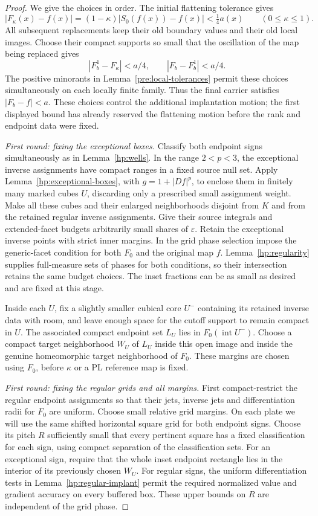 \documentclass[11pt]{article}
\numberwithin{equation}{section}
\theoremstyle{definition}
\theoremstyle{remark}
\begin{document}
\begin{proof}
We give the choices in order.  The initial flattening tolerance gives
\[
 |F_\kappa(x)-f(x)|
   =(1-\kappa)|S_0(f(x))-f(x)|<\tfrac14a(x)
       \qquad(0\leq\kappa\leq1).
\]
All subsequent replacements keep their old boundary values and their
old local images.  Choose their compact supports so small that the
oscillation of the map being replaced gives
\[
 |F_b^1-F_\kappa|<a/4,
 \qquad |F_b-F_b^1|<a/4.
\]
The positive minorants in Lemma~\ref{pre:local-tolerances} permit these
choices simultaneously on each locally finite family.  Thus the final
carrier satisfies $|F_b-f|<a$.  These choices control the additional
implantation motion; the first displayed bound has already reserved
the flattening motion before the rank and endpoint data were fixed.

\emph{First round: fixing the exceptional boxes.}
Classify both endpoint signs simultaneously as in
Lemma~\ref{hp:wells}.  In the range $2<p<3$, the exceptional inverse
assignments have compact ranges in a fixed source null set.  Apply
Lemma~\ref{hp:exceptional-boxes}, with $g=1+|Df|^p$, to enclose them
in finitely many marked cubes $U$, discarding only a prescribed
small assignment weight.  Make all these cubes and their enlarged
neighborhoods disjoint from $K$ and from the retained regular inverse
assignments.  Give their source integrals and extended-facet budgets
arbitrarily small shares of $\varepsilon$.  Retain the exceptional inverse
points with strict inner margins.  In the grid phase selection impose
the generic-facet condition for both $F_0$ and the original map $f$.
Lemma~\ref{hp:regularity} supplies full-measure sets of phases for
both conditions, so their intersection retains the same budget choices.
The inset fractions can be as small as desired and are fixed at this
stage.

Inside each $U$, fix a slightly smaller cubical core $U^-$ containing
its retained inverse data with room, and leave enough space for the
cutoff support to remain compact in $U$.  The associated compact
endpoint set $L_U$ lies in $F_0(\operatorname{int} U^-)$.  Choose a compact
target neighborhood $W_U$ of $L_U$ inside this open image and inside
the genuine homeomorphic target neighborhood of $F_0$.  These margins
are chosen using $F_0$, before $\kappa$ or a PL reference map is fixed.

\emph{First round: fixing the regular grids and all margins.}
First compact-restrict the regular endpoint assignments so that their
jets, inverse jets and differentiation radii for $F_0$ are uniform.
Choose small relative grid margins.  On each plate we will use the
same shifted horizontal square grid for both endpoint signs.  Choose
its pitch $R$ sufficiently small that every pertinent square has a
fixed classification for each sign, using compact separation of the
classification sets.  For an exceptional sign, require that the whole
inset endpoint rectangle lies in the interior of its previously
chosen $W_U$.  For regular signs, the uniform differentiation tests
in Lemma~\ref{hp:regular-implant} permit the required normalized value
and gradient accuracy on every buffered box.  These upper bounds on
$R$ are independent of the grid phase.


\end{proof}
\end{document}
